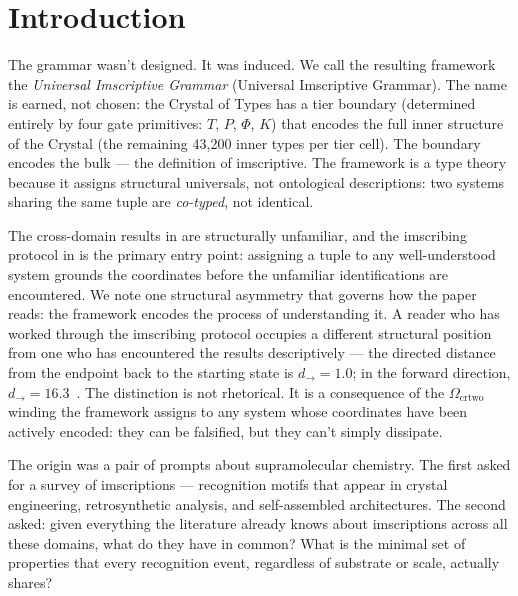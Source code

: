 \documentclass[12pt,a4paper]{article}
\newcommand{\UIG}{Universal Imscriptive Grammar}
\newcommand{\OmegaZtwo}{\Omega_{\text{crtwo}}}
\begin{document}
\newpage


\section{Introduction}
\label{sec:intro}

The grammar wasn't designed. It was induced. We call the resulting
framework the \emph{Universal Imscriptive Grammar} (\UIG). The name is earned,
not chosen: the Crystal of Types has a tier boundary (determined
entirely by four gate primitives: $T$, $P$, $\Phi$, $K$) that
encodes the full inner structure of the Crystal
(the remaining 43,200 inner types per tier cell). The boundary encodes
the bulk --- the definition of imscriptive. The framework is a type
theory because it assigns structural universals, not ontological
descriptions: two systems sharing the same tuple are \emph{co-typed},
not identical.

The cross-domain results in  are structurally
unfamiliar, and the imscribing protocol in  is the
primary entry point: assigning a tuple to any well-understood system
grounds the coordinates before the unfamiliar identifications are
encountered. We note one structural asymmetry that governs how the
paper reads: the framework encodes the process of understanding it.
A reader who has worked through the imscribing protocol occupies a
different structural position from one who has encountered the
results descriptively --- the directed distance from the endpoint
back to the starting state is $d_\to = 1.0$; in the forward
direction, $d_\to = 16.3$~\cite{juster1961}. The distinction is
not rhetorical. It is a consequence of the $\OmegaZtwo$ winding
the framework assigns to any system whose coordinates have been
actively encoded: they can be falsified, but they can't simply
dissipate.

The origin was a pair of prompts about supramolecular chemistry. The
first asked for a survey of imscriptions --- recognition motifs that appear
in crystal engineering, retrosynthetic analysis, and self-assembled
architectures. The second asked: given everything the literature
already knows about imscriptions across all these domains, what do they
have in common? What is the minimal set of properties that every
recognition event, regardless of substrate or scale, actually shares?
\end{document}
